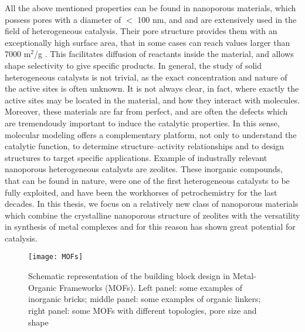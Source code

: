 \npar
All the above mentioned properties can be found in nanoporous materials, which possess pores with a diameter of $<$ 100 nm\cite{mcnaught1997compendium}, and and are extensively used in the field of heterogeneous catalysis. Their pore structure provides them with an exceptionally high surface area, that in some cases can reach values larger than 7000 m$^2$/g \cite{farha2012metal, honicke2018balancing}.
This facilitates diffusion of reactants inside the material, and allows shape selectivity to give specific products. In general, the study of solid heterogeneous catalysts is not trivial, as the exact concentration and nature of the active sites is often unknown. It is not always clear, in fact, where exactly the active sites may be located in the material, and how they interact with molecules. Moreover, these materials are far from perfect, and are often the defects which are tremendously important to induce the catalytic properties. In this sense, molecular modeling offers a complementary platform, not only to understand the catalytic function, to determine structure--activity relationships and to design structures to target specific applications. Example of industrally relevant nanoporous heterogeneous catalysts are zeolites. These inorganic compounds, that can be found in nature, were one of the first heterogeneous catalysts to be fully exploited, and have been the workhorses of petrochemistry for the last decades. 
\npar
In this thesis, we focus on a relatively new class of nanoporous materials which combine the crystalline nanoporous structure of zeolites with the versatility in synthesis of metal complexes and for this reason has shown great potential for catalysis.

\begin{figure}[!htbp]
	\centering
 	\texttt{[image: MOFs]}
	\caption{Schematic representation of the building block design in Metal-Organic Frameworks (MOFs). Left panel: some examples of inorganic bricks; middle panel: some examples of organic linkers; right panel: some MOFs with different topologies, pore size and shape}
	\label{fig:MOFs}
\end{figure}

